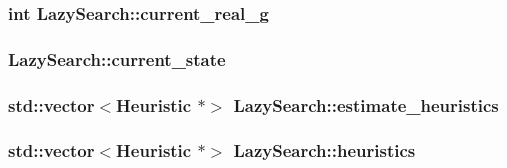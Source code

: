 \hypertarget{classLazySearch_a7dfc150f2a8fcdbec91914f4ce2625f9}{
\subsubsection[{current\-\_\-real\-\_\-g}]{\setlength{\rightskip}{0pt plus 5cm}int Lazy\-Search\-::current\-\_\-real\-\_\-g\hspace{0.3cm}{\ttfamily [protected]}}}\label{classLazySearch_a7dfc150f2a8fcdbec91914f4ce2625f9}
\hypertarget{classLazySearch_a18b13c44ec6b91896779eb41d26038cb}{
\subsubsection[{current\-\_\-state}]{ Lazy\-Search\-::current\-\_\-state\hspace{0.3cm}{\ttfamily [protected]}}}\label{classLazySearch_a18b13c44ec6b91896779eb41d26038cb}
\hypertarget{classLazySearch_a0e6f2058093334ca068a87c828e77b32}{
\subsubsection[{estimate\-\_\-heuristics}]{\setlength{\rightskip}{0pt plus 5cm}std\-::vector$<${\bf Heuristic} $\ast$$>$ Lazy\-Search\-::estimate\-\_\-heuristics\hspace{0.3cm}{\ttfamily [protected]}}}\label{classLazySearch_a0e6f2058093334ca068a87c828e77b32}
\hypertarget{classLazySearch_a8252cee86ea2ca31fe4b7e2d35c2b952}{
\subsubsection[{heuristics}]{\setlength{\rightskip}{0pt plus 5cm}std\-::vector$<${\bf Heuristic} $\ast$$>$ Lazy\-Search\-::heuristics\hspace{0.3cm}{\ttfamily [protected]}}}\label{classLazySearch_a8252cee86ea2ca31fe4b7e2d35c2b952}
